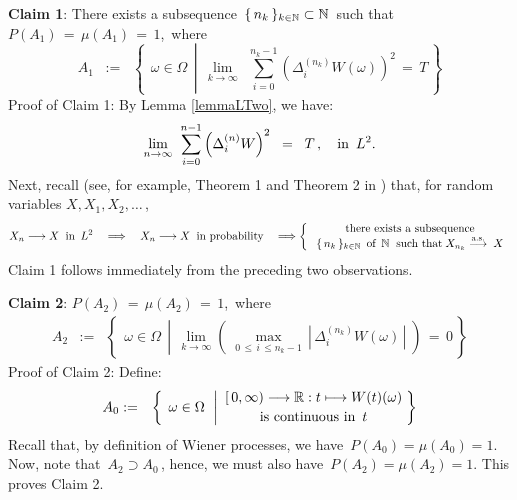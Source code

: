 \vskip 0.5cm
\noindent
\textbf{Claim 1}:\quad
There exists a subsequence \,$\{\,n_{k}\,\}_{k\in\mathbb{N}} \subset \mathbb{N}$\, such that
\,$P(A_{1}) \,=\, \mu(A_{1}) \,=\, 1$,\, where
\begin{equation*}
A_{1}
\;\; := \;\;
	\left\{\;\,
		\omega \in \Omega
		\;\,\left\vert\;\,
		\underset{k\rightarrow\infty}{\lim}\;\,
		\overset{n_{k}-1}{\underset{i=0}{\sum}}\left(\Delta^{(n_{k})}_{i}W(\omega)\right)^{2}
		\, = \, T
		\right.
		\,\right\}
\end{equation*}
Proof of Claim 1:\quad
By Lemma \ref{lemmaLTwo}, we have:
\begin{equation*}
\underset{n \rightarrow \infty}{\lim}\;\;
\overset{n-1}{\underset{i=0}{\sum}}
\left(\Delta^{(n)}_{i}W\right)^{2}
\;\; = \;\;
	T\,,
\quad
\textnormal{in \,$L^{2}$}.
\end{equation*}
Next, recall (see, for example, Theorem 1 and Theorem 2 in \cite{Ferguson1996})
that, for random variables $X, X_{1}, X_{2}, \ldots$\,,
\begin{equation*}
X_{n} \longrightarrow X \;\; \textnormal{in \,$L^{2}$}
\quad\Longrightarrow\quad
X_{n} \longrightarrow X \;\; \textnormal{in probability}
\quad\Longrightarrow
\left\{\;\begin{array}{c}
	\textnormal{there exists a subsequence}
	\\
	\textnormal{$\{\,n_{k}\,\}_{k \in \mathbb{N}}$\, of \,$\mathbb{N}$\; such that}\; X_{n_{k}} \overset{\textnormal{a.s.}}{\longrightarrow}\; X
\end{array}\right.
\end{equation*}
Claim 1 follows immediately from the preceding two observations.

\vskip 0.5cm
\noindent
\textbf{Claim 2}:\quad
$P(A_{2}) \,=\, \mu(A_{2}) \,=\, 1$,\, where
\begin{eqnarray*}
A_{2}
& := &
	\left\{\;\,
		\omega \in \Omega
		\;\,\left\vert\;\,
		\underset{k\rightarrow\infty}{\lim}
		\left(\;\underset{0\,\leq\,i\,\leq n_{k}-1}{\max}\,
			\left\vert\,
				\Delta^{(n_{k})}_{i}W(\omega)
				\,\right\vert
			\;\right)
		\,=\,0
		\right.
		\,\right\}
\end{eqnarray*}
Proof of Claim 2:\quad
Define:
\begin{eqnarray*}
A_{0}
& := &
	\left\{\;\,
		\omega \in \Omega
		\;\,\left\vert
		\begin{array}{c}
		[\,0,\infty) \longrightarrow \Re : t \longmapsto W(t)(\omega)
		\\
		\overset{{\color{white}.}}{\textnormal{is continuous in \,$t$}}
		\end{array}
		\right.
		\!\!\right\}
\end{eqnarray*}
Recall that, by definition of Wiener processes, we have \,$P(A_{0}) = \mu(A_{0}) = 1$.
Now, note that \,$A_{2} \supset A_{0}$\,, hence, we must also have \,$P(A_{2}) = \mu(A_{2}) = 1$.
This proves Claim 2.


